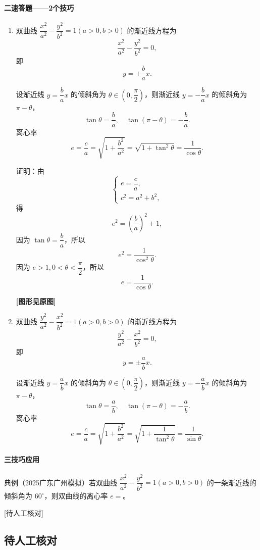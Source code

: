 \documentclass[UTF8,a4paper,11pt]{ctexart}
\begin{document}
\paragraph{二\quad 速答题——2个技巧}
\begin{enumerate}
  \item 双曲线 $\dfrac{x^2}{a^2}-\dfrac{y^2}{b^2}=1(a>0,b>0)$ 的渐近线方程为
  \[
  \frac{x^2}{a^2}-\frac{y^2}{b^2}=0,
  \]
  即
  \[
  y=\pm \frac{b}{a}x.
  \]

  设渐近线 $y=\dfrac{b}{a}x$ 的倾斜角为 $\theta\in\left(0,\dfrac{\pi}{2}\right)$，则渐近线 $y=-\dfrac{b}{a}x$ 的倾斜角为 $\pi-\theta$，
  \[
  \tan\theta=\frac{b}{a},\quad \tan(\pi-\theta)=-\frac{b}{a}.
  \]
  离心率
  \[
  e=\frac{c}{a}=\sqrt{1+\frac{b^2}{a^2}}=\sqrt{1+\tan^2\theta}=\frac{1}{\cos\theta}.
  \]

  证明：由
  \[
  \begin{cases}
  e=\dfrac{c}{a},\\
  c^2=a^2+b^2,
  \end{cases}
  \]
  得
  \[
  e^2=\left(\frac{b}{a}\right)^2+1,
  \]
  因为 $\tan\theta=\dfrac{b}{a}$，所以
  \[
  e^2=\frac{1}{\cos^2\theta}.
  \]
  因为 $e>1,0<\theta<\dfrac{\pi}{2}$，所以
  \[
  e=\frac{1}{\cos\theta}.
  \]

  \textbf{[图形见原图]}

  \item 双曲线 $\dfrac{y^2}{a^2}-\dfrac{x^2}{b^2}=1(a>0,b>0)$ 的渐近线方程为
  \[
  \frac{y^2}{a^2}-\frac{x^2}{b^2}=0,
  \]
  即
  \[
  y=\pm \frac{a}{b}x.
  \]

  设渐近线 $y=\dfrac{a}{b}x$ 的倾斜角为 $\theta\in\left(0,\dfrac{\pi}{2}\right)$，则渐近线 $y=-\dfrac{a}{b}x$ 的倾斜角为 $\pi-\theta$，
  \[
  \tan\theta=\frac{a}{b},\quad \tan(\pi-\theta)=-\frac{a}{b}.
  \]
  离心率
  \[
  e=\frac{c}{a}=\sqrt{1+\frac{b^2}{a^2}}=\sqrt{1+\frac{1}{\tan^2\theta}}=\frac{1}{\sin\theta}.
  \]
\end{enumerate}

\paragraph{三\quad 技巧应用}

典例\quad （2025广东广州模拟）若双曲线 $\dfrac{x^2}{a^2}-\dfrac{y^2}{b^2}=1(a>0,b>0)$ 的一条渐近线的倾斜角为 $60^\circ$，则双曲线的离心率 $e=$\underline{\qquad\qquad}。

[待人工核对]

\subsection*{待人工核对}
\end{document}
